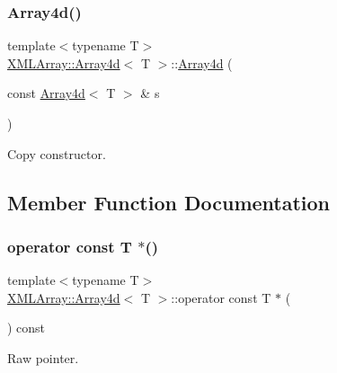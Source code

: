 \subsubsection{\texorpdfstring{Array4d()}{Array4d()}\hspace{0.1cm}{\footnotesize\ttfamily [9/9]}}
{\footnotesize\ttfamily template$<$typename T$>$ \\
\mbox{\hyperlink{classXMLArray_1_1Array4d}{X\+M\+L\+Array\+::\+Array4d}}$<$ T $>$\+::\mbox{\hyperlink{classXMLArray_1_1Array4d}{Array4d}} (\begin{DoxyParamCaption}\item[{const \mbox{\hyperlink{classXMLArray_1_1Array4d}{Array4d}}$<$ T $>$ \&}]{s }\end{DoxyParamCaption})\hspace{0.3cm}{\ttfamily [inline]}}



Copy constructor. 



\subsection{Member Function Documentation}
\mbox{\label{classXMLArray_1_1Array4d_abe07755f692bf1df5acf5b8b9cd266cb}} 
\subsubsection{\texorpdfstring{operator const T $\ast$()}{operator const T *()}\hspace{0.1cm}{\footnotesize\ttfamily [1/3]}}
{\footnotesize\ttfamily template$<$typename T$>$ \\
\mbox{\hyperlink{classXMLArray_1_1Array4d}{X\+M\+L\+Array\+::\+Array4d}}$<$ T $>$\+::operator const T $\ast$ (\begin{DoxyParamCaption}{ }\end{DoxyParamCaption}) const\hspace{0.3cm}{\ttfamily [inline]}}



Raw pointer. 

\mbox{\label{classXMLArray_1_1Array4d_abe07755f692bf1df5acf5b8b9cd266cb}} 
